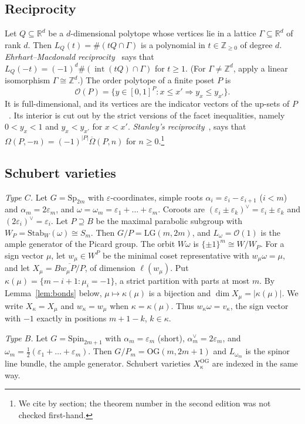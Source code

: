 \documentclass[11pt]{amsart}
\theoremstyle{definition}
\theoremstyle{remark}
\newcommand{\LG}{\mathrm{LG}}
\newcommand{\OG}{\mathrm{OG}}
\newcommand{\cO}{\mathcal{O}}
\newcommand{\Z}{\mathbb{Z}}
\newcommand{\R}{\mathbb{R}}
\newcommand{\Om}{\Omega}
\newcommand{\Omb}{\overline{\Omega}}
\newcommand{\ord}{\mathcal{O}}
\newcommand{\interior}{\operatorname{int}}
\begin{document}
\subsection{Reciprocity}\label{ssec:reciprocity}
Let $Q\subseteq\R^d$ be a $d$-dimensional polytope whose vertices lie in a lattice
$\Gamma\subseteq\R^d$ of rank $d$. Then $L_Q(t)=\#(tQ\cap\Gamma)$ is a polynomial in
$t\in\Z_{\ge0}$ of degree $d$. \emph{Ehrhart--Macdonald reciprocity}~\cite{Mac71,BeckRobins}
says that $L_Q(-t)=(-1)^d\#(\interior(tQ)\cap\Gamma)$ for $t\ge1$. (For $\Gamma\ne\Z^d$,
apply a linear isomorphism $\Gamma\cong\Z^d$.) The order polytope of a finite poset $P$ is
\[ \ord(P)=\{y\in[0,1]^P: x\le x'\Rightarrow y_x\le y_{x'}\}. \]
It is full-dimensional, and its vertices are the indicator vectors of the up-sets of
$P$~\cite{Sta86}. Its interior is cut out by the strict versions of the facet inequalities,
namely $0<y_x<1$ and $y_x<y_{x'}$ for $x<x'$. \emph{Stanley's reciprocity}~\cite{Stanley70},
\cite[\S3.15]{EC1} says that $\Om(P,-n)=(-1)^{|P|}\Omb(P,n)$ for $n\ge0$.\footnote{We cite
\cite{EC1} by section; the theorem number in the second edition was not checked first-hand.}

\subsection{Schubert varieties}\label{ssec:schubert}
\emph{Type $C$.} Let $G=\mathrm{Sp}_{2m}$ with $\varepsilon$-coordinates, simple roots
$\alpha_i=\varepsilon_i-\varepsilon_{i+1}$ ($i<m$) and $\alpha_m=2\varepsilon_m$, and
$\omega=\omega_m=\varepsilon_1+\dots+\varepsilon_m$. Coroots are
$(\varepsilon_i\pm\varepsilon_k)^\vee=\varepsilon_i\pm\varepsilon_k$ and
$(2\varepsilon_i)^\vee=\varepsilon_i$. Let $P\supseteq B$ be the maximal parabolic subgroup
with $W_P=\mathrm{Stab}_W(\omega)\cong S_m$. Then $G/P=\LG(m,2m)$, and
$L_\omega=\cO(1)$ is the ample generator of the Picard group. The orbit $W\omega$ is
$\{\pm1\}^m\cong W/W_P$. For a sign vector $\mu$, let $w_\mu\in W^P$ be the minimal coset
representative with $w_\mu\omega=\mu$, and let
$X_\mu=\overline{Bw_\mu P/P}$, of dimension $\ell(w_\mu)$. Put
$\kappa(\mu)=\{m-i+1:\mu_i=-1\}$, a strict partition with parts at most $m$. By
Lemma~\ref{lem:bonds} below, $\mu\mapsto\kappa(\mu)$ is a bijection and
$\dim X_\mu=|\kappa(\mu)|$. We write $X_\kappa=X_\mu$ and $w_\kappa=w_\mu$ when
$\kappa=\kappa(\mu)$. Thus $w_\kappa\omega=v_\kappa$, the sign vector with $-1$ exactly in
positions $m+1-k$, $k\in\kappa$.

\emph{Type $B$.} Let $G=\mathrm{Spin}_{2m+1}$ with $\alpha_m=\varepsilon_m$ (short),
$\alpha_m^\vee=2\varepsilon_m$, and $\omega_m=\tfrac12(\varepsilon_1+\dots+\varepsilon_m)$.
Then $G/P_m=\OG(m,2m+1)$ and $L_{\omega_m}$ is the spinor line bundle, the ample generator.
Schubert varieties $X^{\OG}_\kappa$ are indexed in the same way.
\end{document}
